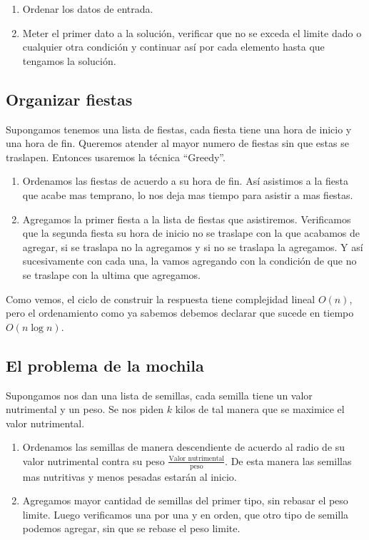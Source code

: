 \begin{enumerate}
    \item Ordenar los datos de entrada.
    \item Meter el primer dato a la solución, verificar que no se exceda el limite dado o cualquier otra condición y continuar así por cada elemento hasta que tengamos la solución.
\end{enumerate}

\subsection{Organizar fiestas}

Supongamos tenemos una lista de fiestas, cada fiesta tiene una hora de inicio y una hora de fin. Queremos atender al mayor numero de fiestas sin que estas se traslapen. Entonces usaremos la técnica ``Greedy''.

\begin{enumerate}
    \item Ordenamos las fiestas de acuerdo a su hora de fin. Así asistimos a la fiesta que acabe mas temprano, lo nos deja mas tiempo para asistir a mas fiestas.
    \item Agregamos la primer fiesta a la lista de fiestas que asistiremos. Verificamos que la segunda fiesta su hora de inicio no se traslape con la que acabamos de agregar, si se traslapa no la agregamos y si no se traslapa la agregamos. Y así sucesivamente con cada una, la vamos agregando con la condición de que no se traslape con la ultima que agregamos.
\end{enumerate}

Como vemos, el ciclo de construir la respuesta tiene complejidad lineal $O(n)$, pero el ordenamiento como ya sabemos debemos declarar que sucede en tiempo $O(n \log n)$.

\subsection{El problema de la mochila}

Supongamos nos dan una lista de semillas, cada semilla tiene un valor nutrimental y un peso. Se nos piden $k$ kilos de tal manera que se maximice el valor nutrimental.

\begin{enumerate}
    \item Ordenamos las semillas de manera descendiente de acuerdo al radio de su valor nutrimental contra su peso $\frac{\text{Valor nutrimental}}{\text{peso}}$. De esta manera las semillas mas nutritivas y menos pesadas estarán al inicio. 
    \item Agregamos mayor cantidad de semillas del primer tipo, sin rebasar el peso limite. Luego verificamos una por una y en orden, que otro tipo de semilla podemos agregar, sin que se rebase el peso limite.
\end{enumerate}

